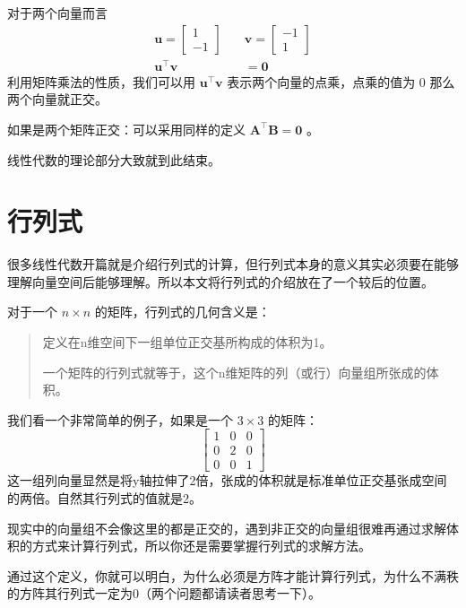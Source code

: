 对于两个向量而言
$$
\begin{aligned}
	\mathbf u =\begin{bmatrix}1\\-1\end{bmatrix}\quad&\mathbf v=\begin{bmatrix}-1\\1\end{bmatrix}\\
	\mathbf u^\top\mathbf v&=\mathbf 0
\end{aligned}
$$
利用矩阵乘法的性质，我们可以用 $\mathbf u^\top\mathbf v$ 表示两个向量的点乘，点乘的值为 $0$ 那么两个向量就正交。


如果是两个矩阵正交：可以采用同样的定义 $\mathbf A^\top\mathbf B=\mathbf 0$ 。

线性代数的理论部分大致就到此结束。

\section{行列式}

很多线性代数开篇就是介绍行列式的计算，但行列式本身的意义其实必须要在能够理解向量空间后能够理解。所以本文将行列式的介绍放在了一个较后的位置。

对于一个 $n\times n$ 的矩阵，行列式的几何含义是：

\begin{quote}
	定义在n维空间下一组单位正交基所构成的体积为1。
	
	一个矩阵的行列式就等于，这个n维矩阵的列（或行）向量组所张成的体积。
\end{quote}

我们看一个非常简单的例子，如果是一个 $3\times 3$ 的矩阵：
$$
\begin{bmatrix}1 & 0 & 0\\0 & 2 & 0\\0 & 0 &1\end{bmatrix}
$$
这一组列向量显然是将y轴拉伸了2倍，张成的体积就是标准单位正交基张成空间的两倍。自然其行列式的值就是2。

现实中的向量组不会像这里的都是正交的，遇到非正交的向量组很难再通过求解体积的方式来计算行列式，所以你还是需要掌握行列式的求解方法。

通过这个定义，你就可以明白，为什么必须是方阵才能计算行列式，为什么不满秩的方阵其行列式一定为0（两个问题都请读者思考一下）。




